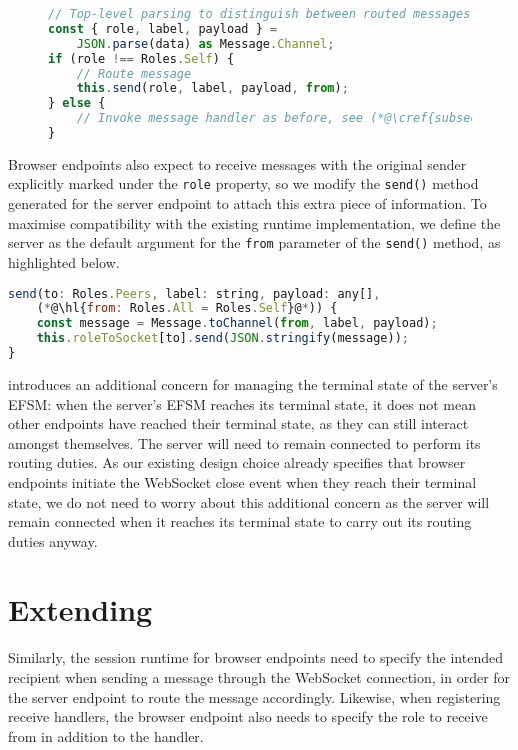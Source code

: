 \begin{figure}[!h]
\begin{lstlisting}[language=javascript]
// Top-level parsing to distinguish between routed messages
const { role, label, payload } = 
	JSON.parse(data) as Message.Channel;
if (role !== Roles.Self) {
	// Route message
	this.send(role, label, payload, from);
} else {
	// Invoke message handler as before, see (*@\cref{subsection:noderuntimereceive}@*)
}
\end{lstlisting}
\label{lst:noderoutereceive}
\end{figure}

Browser endpoints also expect to receive messages
with the original sender explicitly marked under 
the \texttt{role} property, so we modify the 
\texttt{send()} method generated for the server endpoint
to attach this extra piece of information.
To maximise compatibility with the existing runtime
implementation, we define the server as the default 
argument for the \texttt{from} parameter
of the \texttt{send()} method, as highlighted below.

\begin{lstlisting}[language=javascript]
send(to: Roles.Peers, label: string, payload: any[], 
	(*@\hl{from: Roles.All = Roles.Self}@*)) {
	const message = Message.toChannel(from, label, payload);
	this.roleToSocket[to].send(JSON.stringify(message));
}
\end{lstlisting}

\newtheory introduces an additional concern for managing
the terminal state of the server's EFSM:
when the server's EFSM reaches its terminal state,
it does not mean other endpoints have reached their terminal state,
as they can still interact amongst themselves.
The server will need to remain connected to perform its routing duties.
As our existing design choice already specifies that browser
endpoints initiate the WebSocket close event when they reach
their terminal state, we do not need to worry about this
additional concern as the server will remain connected
when it reaches its terminal state to carry out its routing
duties anyway.


\section{Extending \reactcodegen}
\label{section:routedreact}

Similarly, the session runtime for browser endpoints need
to specify the intended recipient when sending a message through the
WebSocket connection, in order for the server endpoint to route the message accordingly.
Likewise, when registering receive handlers, the browser endpoint also 
needs to specify the role to receive from in addition to the handler.

